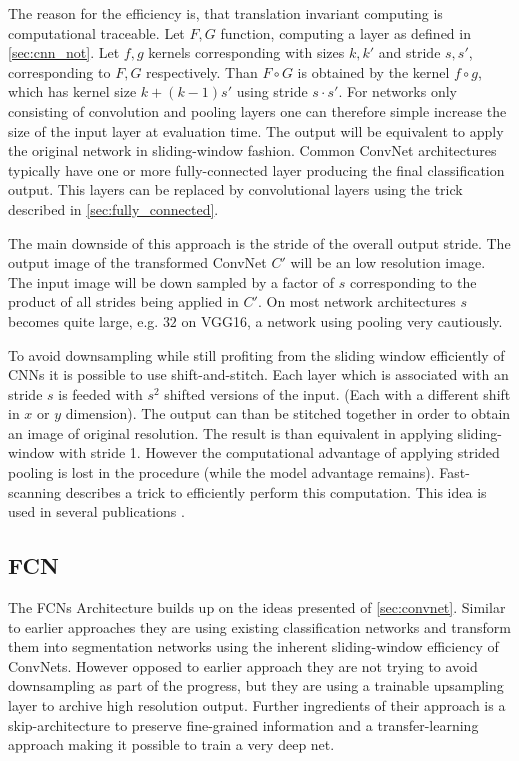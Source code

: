 The reason for the efficiency is, that translation invariant computing is computational traceable. Let $F, G$ function, computing a layer as defined in \cref{sec:cnn_not}. Let $f,g$ kernels corresponding with sizes $k,k'$ and stride $s,s'$, corresponding to $F, G$ respectively. Than $F \circ G$ is obtained by the kernel $f \circ g$, which has kernel size $k + (k-1) s'$ using stride $s \cdot s'$. For networks only consisting of convolution and pooling layers one can therefore simple increase the size of the input layer at evaluation time. The output will be equivalent to apply the original network in sliding-window fashion. Common ConvNet architectures typically have one or more fully-connected layer producing the final classification output. This layers can be replaced by convolutional layers using the trick described in \cref{sec:fully_connected}. 

The main downside of this approach is the stride of the overall output stride. The output image of the transformed ConvNet $C'$ will be an low resolution image. The input image will be down sampled by a factor of $s$ corresponding to the product of all strides being applied in $C'$. On most network architectures $s$ becomes quite large, e.g. $32$ on VGG16, a network using pooling very cautiously. 

To avoid downsampling while still profiting from the sliding window efficiently of \glspl{CNN} it is possible to use shift-and-stitch. Each layer which is associated with an stride $s$ is feeded with $s^2$ shifted versions of the input. (Each with a different shift in $x$ or $y$ dimension). The output can than be stitched together in order to obtain an image of original resolution. The result is than equivalent in applying sliding-window with stride 1. However the computational advantage of applying strided pooling is lost in the procedure (while the model advantage remains). Fast-scanning \cite{fast_scanning} describes a trick to efficiently perform this computation.  This idea is used in several publications \cite{overfeat,huval}.


\subsection{FCN} \label{sec:fcn_detail}

The \glspl{FCN} \cite{fcn} Architecture builds up on the ideas presented of \cref{sec:convnet}. Similar to earlier approaches they are using existing classification networks and transform them into segmentation networks using the inherent sliding-window efficiency of ConvNets. However opposed to earlier approach they are not trying to avoid downsampling as part of the progress, but they are using a trainable upsampling layer to archive high resolution output. Further ingredients of their approach is a skip-architecture to  preserve fine-grained information and a transfer-learning approach making it possible to train a very deep net.


